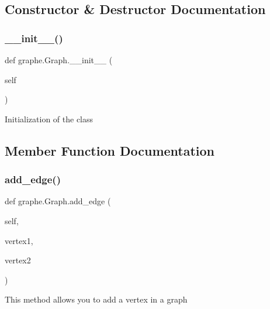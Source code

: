\subsection{Constructor \& Destructor Documentation}
\mbox{\label{classgraphe_1_1Graph_ac27b8aa0b0a84a72bc84af9e0a3c42cd}} 
\subsubsection{\texorpdfstring{\+\_\+\+\_\+init\+\_\+\+\_\+()}{\_\_init\_\_()}}
{\footnotesize\ttfamily def graphe.\+Graph.\+\_\+\+\_\+init\+\_\+\+\_\+ (\begin{DoxyParamCaption}\item[{}]{self }\end{DoxyParamCaption})}

\begin{DoxyVerb}Initialization of the class
\end{DoxyVerb}
 

\subsection{Member Function Documentation}
\mbox{\label{classgraphe_1_1Graph_a944cef16d8feee30f98e8f3c0fc11f18}} 
\subsubsection{\texorpdfstring{add\+\_\+edge()}{add\_edge()}}
{\footnotesize\ttfamily def graphe.\+Graph.\+add\+\_\+edge (\begin{DoxyParamCaption}\item[{}]{self,  }\item[{}]{vertex1,  }\item[{}]{vertex2 }\end{DoxyParamCaption})}

\begin{DoxyVerb}This method allows you to add a vertex in a graph
\end{DoxyVerb}
 \mbox{\label{classgraphe_1_1Graph_a0a1b1627da2894e30d9f65ba38304777}} 
